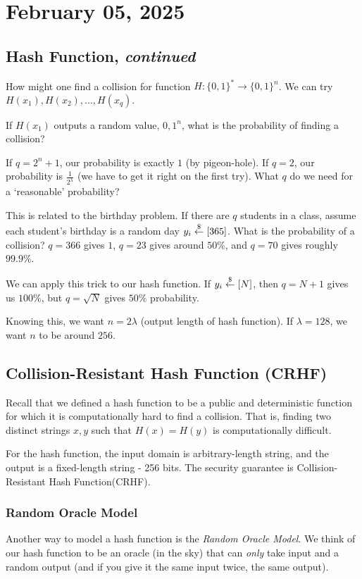 \section{February 05, 2025}
\label{20250205}

\subsection{Hash Function, \emph{continued}}
How might one find a collision for function $H: \{ 0, 1 \}^*\to \{ 0, 1 \}^n$. We can try $H(x_1), H(x_2), \dots, H(x_q)$.

If $H(x_1)$ outputs a random value, ${0, 1}^n$, what is the probability of finding a collision?

If $q = 2^n + 1$, our probability is exactly $1$ (by pigeon-hole). If $q = 2$, our probability is $\frac{1}{2^\lambda}$ (we have to get it right on the first try). What $q$ do we need for a `reasonable' probability?

\begin{remark*}
    This is related to the birthday problem. If there are $q$ students in a class, assume each student's birthday is a random day $y_i\overset{\$}{\leftarrow} [365]$. What is the probability of a collision? $q = 366$ gives $1$, $q = 23$ gives around $50\%$, and $q = 70$ gives roughly $99.9\%$.

    We can apply this trick to our hash function. If $y_i\overset{\$}{\leftarrow} [N]$, then $q = N+1$ gives us $100\%$, but $q = \sqrt{N}$ gives $50\%$ probability.
\end{remark*}

Knowing this, we want $n = 2\lambda$ (output length of hash function). If $\lambda = 128$, we want $n$ to be around $256$.

\subsection{Collision-Resistant Hash Function (CRHF)}
Recall that we defined a hash function to be a public and deterministic function for which it is computationally hard to find a collision. That is, finding two distinct strings $x, y$ such that $H(x) = H(y)$ is computationally difficult.

For the hash function, the input domain is arbitrary-length string, and the output is a fixed-length string - 256 bits. The security guarantee is Collision-Resistant Hash Function(CRHF).

\subsubsection{Random Oracle Model}
Another way to model a hash function is the \emph{Random Oracle Model}. We think of our hash function to be an oracle (in the sky) that can \emph{only} take input and a random output (and if you give it the same input twice, the same output).

